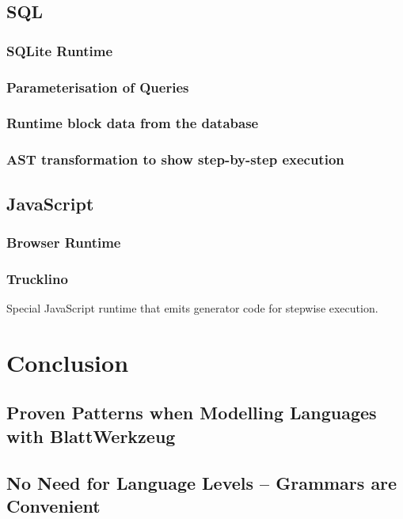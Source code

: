 \documentclass[]{report}
\begin{document}
\section{SQL}
\label{sec:sql}

\subsection{SQLite Runtime}

\subsection{Parameterisation of Queries}

\subsection{Runtime block data from the database}

\subsection{AST transformation to show step-by-step execution}

\section{JavaScript}
\label{sec:javascript}

\subsection{Browser Runtime}

\subsection{Trucklino}
\label{sec:trucklino}

Special JavaScript runtime that emits generator code for stepwise execution.

\chapter{Conclusion}
\label{sec:conclusion}

\section{Proven Patterns when Modelling Languages with Blatt\-Werkzeug}

\section{No Need for Language Levels -- Grammars are Convenient}
\label{sec:no-need-for-levels}
\end{document}
